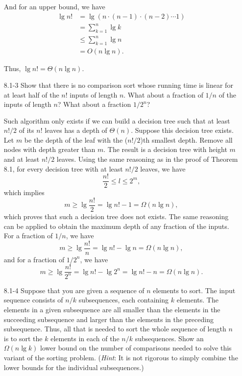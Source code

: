 \begin{enumerate}
\begin{framed}
And for an upper bound, we have
\begin{equation*}
\begin{aligned}
  \lg{n!} &=   \lg(n \cdot (n - 1) \cdot (n - 2) \cdots 1)\\
          &=   \sum_{k = 1}^{n} \lg k\\
          &\le \sum_{k = 1}^{n} \lg n\\
          &=   O(n \lg n).
\end{aligned}
\end{equation*}

Thus, $\lg n! = \Theta(n \lg n)$.
\end{framed}

\newpage

\item[8.1{-}3]{Show that there is no comparison sort whose running time is
linear for at least half of the $n!$ inputs of length $n$. What about a fraction
of $1/n$ of the inputs of length $n$?  What about a fraction $1/2^n$?}

\begin{framed}
Such algorithm only exists if we can build a decision tree such that at least
$n!/2$ of its $n!$ leaves has a depth of $\Theta(n)$. Suppose this decision tree
exists. Let $m$ be the depth of the leaf with the ($n!/2$)th smallest depth.
Remove all nodes with depth greater than $m$. The result is a decision tree
with height $m$ and at least $n!/2$ leaves. Using the same reasoning as in the
proof of Theorem 8.1, for every decision tree with at least $n!/2$ leaves, we
have
\[
  \frac{n!}{2} \le l \le 2^{m},
\]
which implies
\[
  m \ge \lg \frac{n!}{2} = \lg n! - 1 = \Omega(n \lg n),
\]
which proves that such a decision tree does not exists. The same reasoning can
be applied to obtain the maximum depth of any fraction of the inputs. For
a fraction of $1/n$, we have
\[
  m \ge \lg \frac{n!}{n} = \lg n! - \lg n = \Omega(n \lg n),
\]
and for a fraction of $1/2^n$, we have
\[
  m \ge \lg \frac{n!}{2^n} = \lg n! - \lg 2^n = \lg n! - n = \Omega(n \lg n).
\]
\end{framed}

\item[8.1{-}4]{Suppose that you are given a sequence of $n$ elements to sort.
The input sequence consists of $n/k$ subsequences, each containing $k$ elements.
The elements in a given subsequence are all smaller than the elements in the
succeeding subsequence and larger than the elements in the preceding
subsequence. Thus, all that is needed to sort the whole sequence of length
$n$ is to sort the $k$ elements in each of the $n/k$ subsequences. Show an
$\Omega(n \lg k)$ lower bound on the number of comparisons needed to solve this
variant of the sorting problem. (\emph{Hint}: It is not rigorous to simply
combine the lower bounds for the individual subsequences.)}


\end{enumerate}
